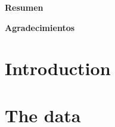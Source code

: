 \documentclass[phd, titlesmallcaps, copyrightpage]{mqthesis}
\numberwithin{equation}{chapter}
\begin{document}
\newpage

\thispagestyle{empty}
{\Huge \bf \vspace*{5 ex} Resumen}

\vspace*{8 ex}%
%
\newpage

\thispagestyle{empty}
{\Huge \bf \vspace*{5 ex} Agradecimientos}
\vspace*{8 ex}%
%
\newpage

\tableofcontents
\listoffigures
\listoftables

\chapter{Introduction}
%
%
%



 


%
%
%
%

%
%
%
%
%

%


\chapter{The data}

%
\end{document}
